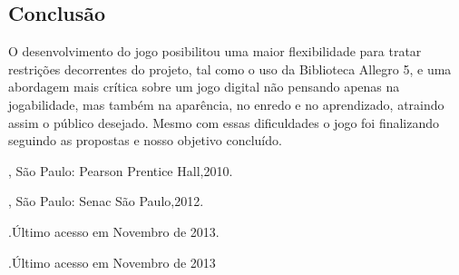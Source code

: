 \documentclass{sciposter}
\begin{document}
\begin{multicols}{2}
\section{Conclusão}

O desenvolvimento do jogo posibilitou uma maior flexibilidade para tratar restrições decorrentes do projeto, tal como o uso da Biblioteca Allegro 5,  e uma abordagem mais crítica sobre um jogo digital não pensando apenas na jogabilidade, mas também na aparência, no enredo e no aprendizado, atraindo assim o público desejado. Mesmo com essas dificuldades o jogo foi finalizando seguindo as propostas e nosso objetivo concluído.



\begin{thebibliography}{1}


, São Paulo: Pearson Prentice Hall,2010.


, São Paulo: Senac São Paulo,2012.


.Último acesso em Novembro de 2013.


.Último acesso em Novembro de 2013

\end{thebibliography}

\end{multicols}
\end{document}
